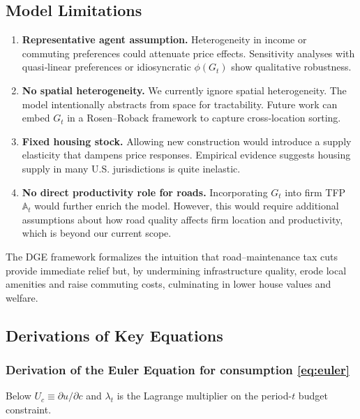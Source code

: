 
\subsection{Model Limitations}
\begin{enumerate}
  \item \textbf{Representative agent assumption.}\; Heterogeneity in income or commuting preferences could attenuate price effects. Sensitivity analyses with quasi‐linear preferences or idiosyncratic $\phi(G_t)$ show qualitative robustness.
  \item \textbf{No spatial heterogeneity.}\; We currently ignore spatial heterogeneity. The model intentionally abstracts from space for tractability. Future work can embed $G_t$ in a Rosen--Roback framework to capture cross‐location sorting.
  \item \textbf{Fixed housing stock.}\; Allowing new construction would introduce a supply elasticity that dampens price responses. Empirical evidence suggests housing supply in many U.S. jurisdictions is quite inelastic.
  \item \textbf{No direct productivity role for roads.}\; Incorporating $G_t$ into firm TFP $\mathbb{A}_t$ would further enrich the model. However, this would require additional assumptions about how road quality affects firm location and productivity, which is beyond our current scope.
\end{enumerate}

The DGE framework formalizes the intuition that road–maintenance tax cuts provide immediate relief but, by undermining infrastructure quality, erode local amenities and raise commuting costs, culminating in lower house values and welfare.

\vskip 0.3cm

\subsection{Derivations of Key Equations}

\subsubsection{Derivation of the Euler Equation for consumption \ref{eq:euler}}

Below \( U_c \equiv \partial u / \partial c \) and \( \lambda_t \) is the Lagrange multiplier on the period-\( t \) budget constraint.

